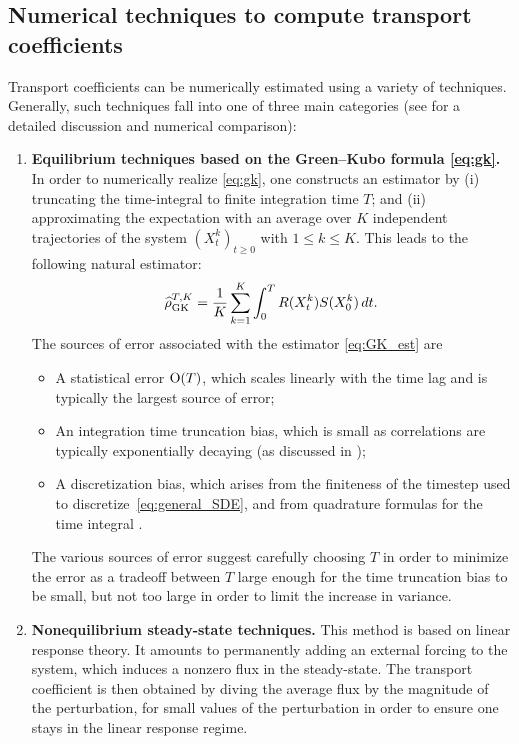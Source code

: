 \subsection{Numerical techniques to compute transport coefficients}
\label{subsec:num_tech}
%
Transport coefficients can be numerically estimated using a variety of techniques. Generally, such techniques fall into one of three main categories (see \cite{lelievre2016,stoltz2024} for a detailed discussion and numerical comparison):
%
    \begin{enumerate}
    \item {\bf Equilibrium techniques based on the Green--Kubo formula \eqref{eq:gk}.} In order to numerically realize \eqref{eq:gk}, one constructs an estimator by (i) truncating the time-integral to finite integration time $T$; and (ii) approximating the expectation with an average over $K$ independent trajectories of the system $(X_t^k)_{t\geq 0}$ with $1\leq k\leq K$. This leads to the following natural estimator:
    \begin{equation}
        \mathcal{\widehat{\rho}}^{T,K}_{\rm GK} = \frac{1}{K}\sum_{k=1}^K \int_0^T R(X_t^k)S(X_0^k) \, dt.
        \label{eq:GK_est}
    \end{equation}
    The sources of error associated with the estimator \eqref{eq:GK_est} are
    \begin{itemize}
    	\item A statistical error $\mathrm{O}(T)$, which scales linearly with the time lag \cite{sousaoliveira2017,plechac2022,gastaldello2024} and is typically the largest source of error;
    	\item An integration time truncation bias, which is small as correlations are typically exponentially decaying (as discussed in \cite{plechac2022});
    	\item A discretization bias, which arises from the finiteness of the timestep used to discretize~\eqref{eq:general_SDE}, and from quadrature formulas for the time integral \cite{leimkuhler2016,lelievre2016}.
    \end{itemize}
    The various sources of error suggest carefully choosing $T$ in order to minimize the error as a tradeoff between $T$ large enough for the time truncation bias to be small, but not too large in order to limit the increase in variance.
    
    \item {\bf Nonequilibrium steady-state techniques.} This method is based on linear response theory. It amounts to permanently adding an external forcing to the system, which induces a nonzero flux in the steady-state. The transport coefficient is then obtained by diving the average flux by the magnitude of the perturbation, for small values of the perturbation in order to ensure one stays in the linear response regime.
       

\end{enumerate}
